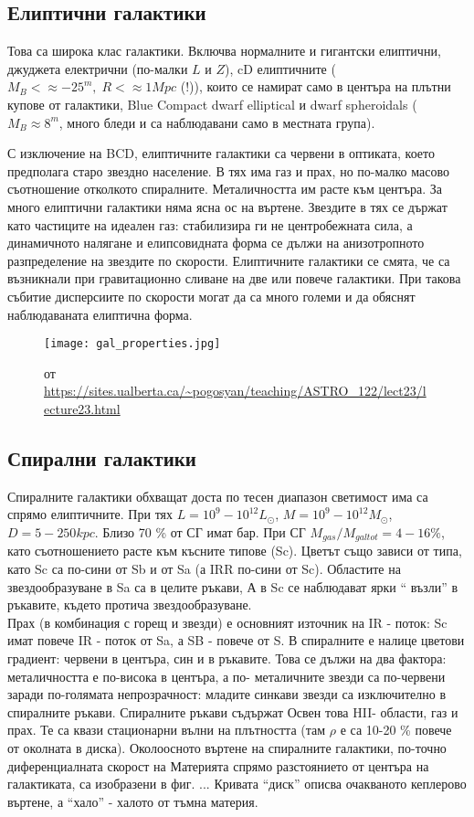 \documentclass[a4paper,12pt]{article}
\begin{document}
\subsection{Елиптични галактики}
Това са широка клас галактики. Включва нормалните и гигантски елиптични, джуджета електрични (по-малки $L$ и $Z$), cD елиптичните ($M_B < \approx -25^m, \; R < \approx 1 Mpc$ (!)), които се намират само в центъра на плътни купове от галактики, Blue Compact dwarf elliptical и dwarf spheroidals ($M_B \approx 8^m$, много бледи и са наблюдавани само в местната група).

С изключение на BCD, елиптичните галактики са червени в оптиката, което предполага старо звездно население. В тях има газ и прах, но по-малко масово съотношение отколкото спиралните. Металичността им расте към центъра. За много елиптични галактики няма ясна ос на въртене. Звездите в тях се държат като частиците на идеален газ: стабилизира ги не центробежната сила, а динамичното налягане и елипсовидната форма се дължи на анизотропното разпределение на звездите по скорости. Елиптичните галактики се смята, че са възникнали при гравитационно сливане на две или повече галактики. При такова събитие дисперсиите по скорости могат да са много големи и да обяснят наблюдаваната елиптична форма.

\begin{figure}[h!]
\centering
\texttt{[image: gal\_properties.jpg]}
\caption{от \url{https://sites.ualberta.ca/~pogosyan/teaching/ASTRO_122/lect23/lecture23.html}}
\label{fig:gal_properties}
\end{figure}

\subsection{Спирални галактики}
Спиралните галактики обхващат доста по тесен диапазон светимост има са спрямо елиптичните. При тях $L=10^9-10^12 L_\odot$, $M=10^9 - 10^{12} M_\odot$, $D=5-250 kpc$.  Близо 70 \% от СГ имат бар.  При СГ $M_{gas}/M_{galtot}=4-16 \%$, като съотношението расте към късните типове (Sc). Цветът също зависи от типа, като Sc са по-сини от Sb и от Sa (а IRR по-сини от Sc). Областите на звездообразуване в Sa са в целите ръкави, А в Sc се наблюдават ярки `` възли'' в ръкавите, където протича звездообразуване.\\

Прах (в комбинация с горещ и звезди) е основният източник на IR - поток: Sc имат повече IR - поток от Sa, а SB - повече от S. В спиралните е налице цветови градиент: червени в центъра, син и в ръкавите. Това се дължи на два фактора: металичността е по-висока в центъра, а по- металичните звезди са по-червени заради по-голямата непрозрачност: младите синкави звезди са изключително в спиралните ръкави. Спиралните ръкави съдържат Освен това HII- области, газ и прах. Те са квази стационарни вълни на плътността (там $\rho$ е са 10-20 \% повече от околната в диска). Околоосното въртене на спиралните галактики, по-точно диференциалната скорост на Материята спрямо разстоянието от центъра на галактиката, са изобразени в фиг. ... Кривата ``диск'' описва очакваното кеплерово въртене, а ``хало'' - халото от тъмна материя.
\end{document}
